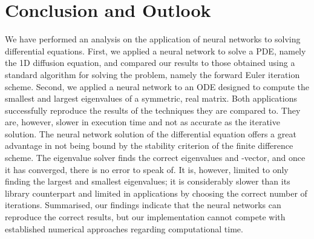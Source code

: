\documentclass[a4paper, 
amsfonts, 
amssymb, 
amsmath, 
reprint, 
showkeys, 
nofootinbib, 
twoside]{revtex4-2}
\begin{document}
\section{Conclusion and Outlook}

We have performed an analysis on the application of neural networks to solving differential equations. First, we applied a neural network to solve a PDE, namely the 1D diffusion equation, and compared our results to those obtained using a standard algorithm for solving the problem, namely the forward Euler iteration scheme. Second, we applied a neural network to an ODE designed to compute the smallest and largest eigenvalues of a symmetric, real matrix. Both applications successfully reproduce the results of the techniques they are compared to. They are, however, slower in execution time and not as accurate as the iterative solution. The neural network solution of the differential equation offers a great advantage in not being bound by the stability criterion of the finite difference scheme. 
The eigenvalue solver finds the correct eigenvalues and -vector, and once it has converged, there is no error to speak of. It is, however, limited to only finding the largest and smallest eigenvalues; it is considerably slower than its library counterpart and limited in applications by choosing the correct number of iterations. 
Summarised, our findings indicate that the neural networks can reproduce the correct results, but our implementation cannot compete with established numerical approaches regarding computational time. 

% 

\end{document}
